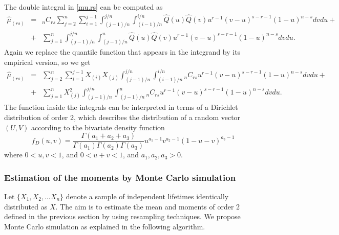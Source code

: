 \documentclass[preprint,12pt]{elsarticle}
\begin{document}
The double integral in \eqref{mu.rs} can be computed as
\begin{eqnarray}\label{mu.rs.hat1}
\nonumber \widehat{\mu}_{(rs)}&=&_nC_{rs}\sum_{j=2}^n \sum_{i=1}^{j-1}\int_{(j-1)/n}^{j/n}\int_{(i-1)/n}^{i/n} \widehat{Q}(u)\widehat{Q}(v) u^{r-1}(v-u)^{s-r-1}(1-u)^{n-s}dvdu +\\
&+& \sum_{j=1}^n \int_{(j-1)/n}^{j/n}\int_{(j-1)/n}^{u} \widehat{Q}(u)\widehat{Q}(v) u^{r-1}(v-u)^{s-r-1}(1-u)^{n-s}dvdu.
\end{eqnarray}
Again we replace the quantile function that appears in the integrand by its empirical version, so we get 
\begin{eqnarray}\label{mu.rs.hat2}
\nonumber \widehat{\mu}_{(rs)}&=&\sum_{j=2}^n \sum_{i=1}^{j-1} X_{(i)}X_{(j)}\int_{(j-1)/n}^{j/n}\int_{(i-1)/n}^{i/n} {_n}C_{rs} u^{r-1}(v-u)^{s-r-1}(1-u)^{n-s} dv du +\\
 &+& \sum_{j=1}^n X_{(j)}^2\int_{(j-1)/n}^{j/n}\int_{(j-1)/n}^{u} {_n}C_{rs} u^{r-1}(v-u)^{s-r-1}(1-u)^{n-s}dvdu.
\end{eqnarray}
The function inside the integrals can be interpreted in terms  of a Dirichlet distribution of order 2, which describes the distribution of a random vector $(U,V)$ according to the  bivariate density function
\begin{equation}\label{diri}
f_D(u,v)=\frac{\Gamma(a_1+a_2+a_3)}{\Gamma(a_1)\Gamma(a_2)\Gamma(a_3)}u^{a_1-1}v^{a_2-1}(1-u-v)^{a_3-1}
\end{equation}
where $0<u,v<1$, and $0<u+v<1$, and $a_1, a_2, a_3 >0$.





\subsubsection{Estimation of the moments by Monte Carlo simulation}

Let $\{X_1, X_2, \ldots  X_n\}$ denote a sample of independent lifetimes identically distributed as $X$. The aim is to estimate the mean and moments of order 2 defined in the previous section by using resampling techniques. We propose Monte Carlo simulation as explained in the following algorithm. 
\end{document}
